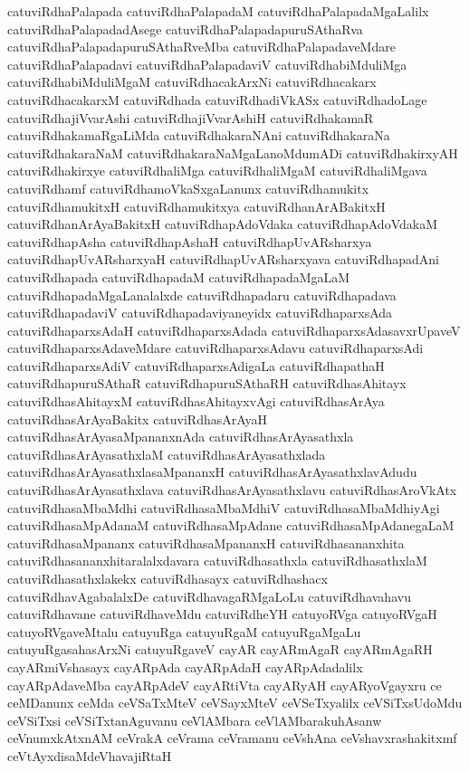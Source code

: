 {catuviRdhaPalapada
catuviRdhaPalapadaM
catuviRdhaPalapadaMgaLalilx
catuviRdhaPalapadadAsege
catuviRdhaPalapadapuruSAthaRva
catuviRdhaPalapadapuruSAthaRveMba
catuviRdhaPalapadaveMdare
catuviRdhaPalapadavi
catuviRdhaPalapadaviV
catuviRdhabiMduliMga
catuviRdhabiMduliMgaM
catuviRdhacakArxNi
catuviRdhacakarx
catuviRdhacakarxM
catuviRdhada
catuviRdhadiVkASx
catuviRdhadoLage
catuviRdhajiVvarAshi
catuviRdhajiVvarAshiH
catuviRdhakamaR
catuviRdhakamaRgaLiMda
catuviRdhakaraNAni
catuviRdhakaraNa
catuviRdhakaraNaM
catuviRdhakaraNaMgaLanoMdumADi
catuviRdhakirxyAH
catuviRdhakirxye
catuviRdhaliMga
catuviRdhaliMgaM
catuviRdhaliMgava
catuviRdhamf
catuviRdhamoVkaSxgaLanunx
catuviRdhamukitx
catuviRdhamukitxH
catuviRdhamukitxya
catuviRdhanArABakitxH
catuviRdhanArAyaBakitxH
catuviRdhapAdoVdaka
catuviRdhapAdoVdakaM
catuviRdhapAsha
catuviRdhapAshaH
catuviRdhapUvARsharxya
catuviRdhapUvARsharxyaH
catuviRdhapUvARsharxyava
catuviRdhapadAni
catuviRdhapada
catuviRdhapadaM
catuviRdhapadaMgaLaM
catuviRdhapadaMgaLanalalxde
catuviRdhapadaru
catuviRdhapadava
catuviRdhapadaviV
catuviRdhapadaviyaneyidx
catuviRdhaparxsAda
catuviRdhaparxsAdaH
catuviRdhaparxsAdada
catuviRdhaparxsAdasavxrUpaveV
catuviRdhaparxsAdaveMdare
catuviRdhaparxsAdavu
catuviRdhaparxsAdi
catuviRdhaparxsAdiV
catuviRdhaparxsAdigaLa
catuviRdhapathaH
catuviRdhapuruSAthaR
catuviRdhapuruSAthaRH
catuviRdhasAhitayx
catuviRdhasAhitayxM
catuviRdhasAhitayxvAgi
catuviRdhasArAya
catuviRdhasArAyaBakitx
catuviRdhasArAyaH
catuviRdhasArAyasaMpananxnAda
catuviRdhasArAyasathxla
catuviRdhasArAyasathxlaM
catuviRdhasArAyasathxlada
catuviRdhasArAyasathxlasaMpananxH
catuviRdhasArAyasathxlavAdudu
catuviRdhasArAyasathxlava
catuviRdhasArAyasathxlavu
catuviRdhasAroVkAtx
catuviRdhasaMbaMdhi
catuviRdhasaMbaMdhiV
catuviRdhasaMbaMdhiyAgi
catuviRdhasaMpAdanaM
catuviRdhasaMpAdane
catuviRdhasaMpAdanegaLaM
catuviRdhasaMpananx
catuviRdhasaMpananxH
catuviRdhasananxhita
catuviRdhasananxhitaralalxdavara
catuviRdhasathxla
catuviRdhasathxlaM
catuviRdhasathxlakekx
catuviRdhasayx
catuviRdhashacx
catuviRdhavAgabalalxDe
catuviRdhavagaRMgaLoLu
catuviRdhavahavu
catuviRdhavane
catuviRdhaveMdu
catuviRdheYH
catuyoRVga
catuyoRVgaH
catuyoRVgaveMtalu
catuyuRga
catuyuRgaM
catuyuRgaMgaLu
catuyuRgasahasArxNi
catuyuRgaveV
cayAR
cayARmAgaR
cayARmAgaRH
cayARmiVshasayx
cayARpAda
cayARpAdaH
cayARpAdadalilx
cayARpAdaveMba
cayARpAdeV
cayARtiVta
cayARyAH
cayARyoVgayxru
ce
ceMDanunx
ceMda
ceVSaTxMteV
ceVSayxMteV
ceVSeTxyalilx
ceVSiTxsUdoMdu
ceVSiTxsi
ceVSiTxtanAguvanu
ceVlAMbara
ceVlAMbarakuhAsanw
ceVnumxkAtxnAM
ceVrakA
ceVrama
ceVramanu
ceVshAna
ceVshavxrashakitxmf
ceVtAyxdisaMdeVhavajiRtaH
}
